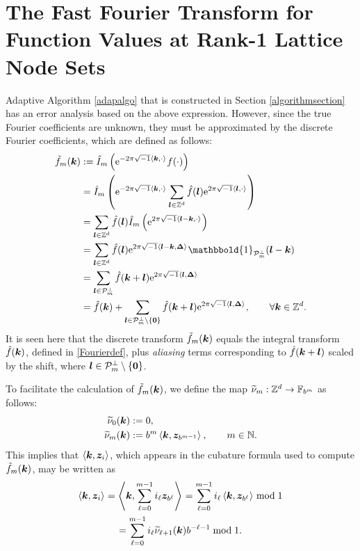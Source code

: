\documentclass[graybox]{svmult}
\newcommand{\Z}{\mathbb{Z}} %
\newcommand{\N}{\mathbb{N}} %
\newcommand{\F}{\mathbb{F}} %
\newcommand{\bszero}{\boldsymbol{0}} %
\newcommand{\bsz}{\boldsymbol{z}}    %
\newcommand{\bsDelta}{\boldsymbol{\Delta}}    %
\newcommand{\ind}{\mathbbold{1}}
\begin{document}
\section{The Fast Fourier Transform for Function Values at Rank-1 Lattice Node Sets}\label{FFT}

Adaptive Algorithm \ref{adapalgo} that is constructed in Section \ref{algorithmsection} has an error analysis based on the above expression.  However, since the true Fourier coefficients are unknown, they must be approximated by the discrete Fourier coefficients, which are defined as follows:
\begin{subequations} \label{tfdefalias}
\begin{align}
\tf_m(\bsk)
&:= \hI_m\left( \E^{-2 \pi \sqrt{-1} \ip{\bsk}{\cdot}} f(\cdot) \right) \label{tfdef}\\
\nonumber
& = \hI_m\left( \E^{-2 \pi \sqrt{-1} \ip{\bsk}{\cdot}} \sum_{\bsl \in \Z^d} \hf(\bsl) \E^{2 \pi \sqrt{-1} \ip{\bsl}{\cdot}}  \right) \\
\nonumber
& = \sum_{\bsl \in \Z^d} \hf(\bsl) \hI_m\left( \E^{2 \pi \sqrt{-1} \ip{\bsl-\bsk}{\cdot}}  \right) \\
\nonumber
& = \sum_{\bsl \in \Z^d} \hf(\bsl) \E^{2 \pi \sqrt{-1} \ip{\bsl - \bsk}{\bsDelta}} \ind_{\cp_m^{\perp}}(\bsl - \bsk) \\
\nonumber
& = \sum_{\bsl \in \cp^{\perp}_m} \hf(\bsk+\bsl) \E^{2 \pi \sqrt{-1} \ip{\bsl }{\bsDelta}} \\
&= \hf(\bsk) + \sum_{\bsl \in \cp^{\perp}_m\setminus \{\bszero\}} \hf(\bsk+\bsl) \E^{2 \pi \sqrt{-1} \ip{\bsl }{\bsDelta}}, \qquad \forall \bsk \in \Z^d. \label{tfassum}
\end{align}
\end{subequations}
It is seen here that the discrete transform $\tilde{f}_m(\boldsymbol{k})$ equals the integral transform $\hat{f}(\boldsymbol{k})$, defined in \eqref{Fourierdef}, plus \emph{aliasing} terms corresponding to $\hat{f}(\boldsymbol{k}+\boldsymbol{l})$ scaled by the shift, where $\bsl \in \cp_{m}^{\perp}\setminus \left\{\bszero\right\}$.


To facilitate the calculation of $\tilde{f}_m(\boldsymbol{k})$, we define the map $\tnu_m : \Z^d \to \F_{b^m}$ as follows:
\begin{align} \label{kdotzbm}
\nonumber
\tnu_{0}(\bsk) &:= 0, \\
\tnu_{m}(\bsk) &:= b^{m} \ip{\bsk}{\bsz_{b^{m-1}}}, \qquad m \in \N.
\end{align}
This implies that $\ip{\bsk}{\bsz_i}$, which appears in the cubature formula used to compute $\tilde{f}_m(\boldsymbol{k})$, may be written as
\begin{multline} \label{kdotzi}
\ip{\bsk}{\bsz_i} = \ip{\bsk}{\sum_{\ell=0}^{m-1} i_\ell \bsz_{b^{\ell}}} = \sum_{\ell=0}^{m-1} i_\ell \ip{\bsk}{\bsz_{b^{\ell}}} \bmod 1 \\
=\sum_{\ell=0}^{m-1} i_\ell \tnu_{\ell+1}(\bsk)  b^{-\ell-1} \bmod 1.
\end{multline}
\end{document}
